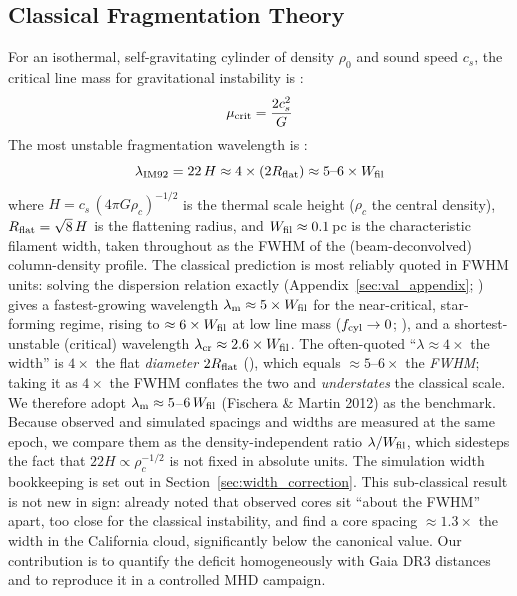 \documentclass[usenatbib,twoside,twocolumn]{mnras}
\begin{document}
\subsection{Classical Fragmentation Theory}

For an isothermal, self-gravitating cylinder of density $\rho_0$ and sound speed $c_s$, the critical line mass for gravitational instability is \citep{Ostriker1964}:
\begin{equation}
\mu_{\rm crit} = \frac{2c_s^2}{G}
\end{equation}
The most unstable fragmentation wavelength is \citep{Inutsuka1992}:
\begin{equation}
\lambda_{\rm IM92} = 22\,H \approx 4\times(2R_{\rm flat}) \approx 5\text{--}6\times W_{\rm fil}
\label{eq:im92}
\end{equation}
where $H = c_s\,(4\pi G\rho_c)^{-1/2}$ is the thermal scale height ($\rho_c$ the central density), $R_{\rm flat}=\sqrt8\,H$ is the flattening radius, and $W_{\rm fil}\approx0.1$\,pc is the characteristic filament width, taken throughout as the FWHM of the (beam-deconvolved) column-density profile. The classical prediction is most reliably quoted in FWHM units: solving the dispersion relation exactly (Appendix~\ref{sec:val_appendix}; \citealt{Fischera2012}) gives a fastest-growing wavelength $\lambda_{\rm m}\approx5\times W_{\rm fil}$ for the near-critical, star-forming regime, rising to $\approx6\times W_{\rm fil}$ at low line mass ($f_{\rm cyl}\to0$; \citealt{Fischera2012}), and a shortest-unstable (critical) wavelength $\lambda_{\rm cr}\approx2.6\times W_{\rm fil}$. The often-quoted ``$\lambda\approx4\times$ the width'' is $4\times$ the flat \emph{diameter} $2R_{\rm flat}$ (\citealt{Inutsuka1992}), which equals $\approx5$--$6\times$ the \emph{FWHM}; taking it as $4\times$ the FWHM conflates the two and \emph{understates} the classical scale. We therefore adopt $\lambda_{\rm m}\approx5$--$6\,W_{\rm fil}$ (Fischera \& Martin 2012) as the benchmark. Because observed and simulated spacings and widths are measured at the same epoch, we compare them as the density-independent ratio $\lambda/W_{\rm fil}$, which sidesteps the fact that $22H\propto\rho_c^{-1/2}$ is not fixed in absolute units. The simulation width bookkeeping is set out in Section~\ref{sec:width_correction}. This sub-classical result is not new in sign: \citet{Fischera2012} already noted that observed cores sit ``about the FWHM'' apart, too close for the classical instability, and \citet{Zhang2023cal} find a core spacing $\approx1.3\times$ the width in the California cloud, significantly below the canonical value. Our contribution is to quantify the deficit homogeneously with Gaia DR3 distances and to reproduce it in a controlled MHD campaign.
\end{document}
